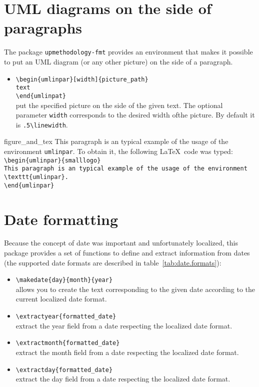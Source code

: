 \documentclass[book]{upmethodology-document}
\begin{document}
\section{UML diagrams on the side of paragraphs}

The package \texttt{upmethodology-fmt} provides an environment that makes it possible to put an UML diagram (or any other picture) on the side of a paragraph.

\begin{itemize}
\item \texttt{{\textbackslash}begin\{umlinpar\}[width]\{picture\_path\}}\\\texttt{text}\\\texttt{{\textbackslash}end\{umlinpat\}} \\
	put the specified picture on the side of the given text. The optional parameter \texttt{width} corresponds to the desired width ofthe picture. By default it is \texttt{.5{\textbackslash}linewidth}.
\end{itemize}

\begin{umlinpar}{figure_and_tex}
	This paragraph is an typical example of the usage of the environment \texttt{umlinpar}. To obtain it, the following \LaTeX\ code was typed: \\
\texttt{{\textbackslash}begin\{umlinpar\}\{smalllogo\}} \\
\texttt{This paragraph is an typical example of the usage of the environment {\textbackslash}texttt\{umlinpar\}.} \\
\texttt{{\textbackslash}end\{umlinpar\}} \\
\end{umlinpar}

\section{Date formatting}

Because the concept of date was important and unfortunately localized, this package provides a set of functions to define and extract information from dates (the supported date formats are described in table~\ref{tab:date.formats}):

\begin{itemize}
\item \texttt{{\textbackslash}makedate\{day\}\{month\}\{year\}}\\
allows you to create the text corresponding to the given date according to the current localized date format.
\item \texttt{{\textbackslash}extractyear\{formatted\_date\}}\\
extract the year field from a date respecting the localized date format.
\item \texttt{{\textbackslash}extractmonth\{formatted\_date\}}\\
extract the month field from a date respecting the localized date format.
\item \texttt{{\textbackslash}extractday\{formatted\_date\}}\\
extract the day field from a date respecting the localized date format.
\end{itemize}
\end{document}
